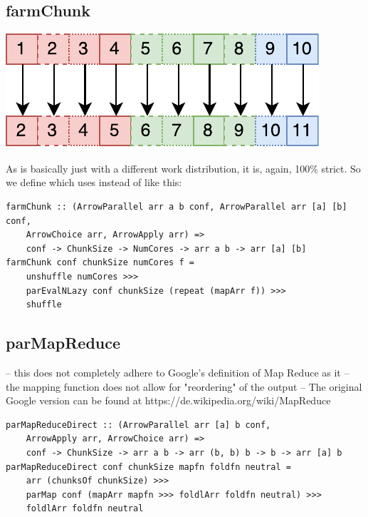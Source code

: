 \subsection{farmChunk}
\begin{center}
	\includegraphics[scale=0.7]{images/farmChunk}
\end{center}
As  is basically just  with a different work distribution, it is, again, 100\% strict. So we define  which uses  instead of  like this:
\begin{lstlisting}[frame=htrbl]
farmChunk :: (ArrowParallel arr a b conf, ArrowParallel arr [a] [b] conf,
	ArrowChoice arr, ArrowApply arr) =>
	conf -> ChunkSize -> NumCores -> arr a b -> arr [a] [b]
farmChunk conf chunkSize numCores f =
	unshuffle numCores >>>
	parEvalNLazy conf chunkSize (repeat (mapArr f)) >>>
	shuffle
\end{lstlisting}

\subsection{parMapReduce}
-- this does not completely adhere to Google's definition of Map Reduce as it
-- the mapping function does not allow for "reordering" of the output
-- The original Google version can be found at https://de.wikipedia.org/wiki/MapReduce

\begin{lstlisting}[frame=htrbl]
parMapReduceDirect :: (ArrowParallel arr [a] b conf,
	ArrowApply arr, ArrowChoice arr) =>
	conf -> ChunkSize -> arr a b -> arr (b, b) b -> b -> arr [a] b
parMapReduceDirect conf chunkSize mapfn foldfn neutral =
	arr (chunksOf chunkSize) >>>
	parMap conf (mapArr mapfn >>> foldlArr foldfn neutral) >>>
	foldlArr foldfn neutral
\end{lstlisting}